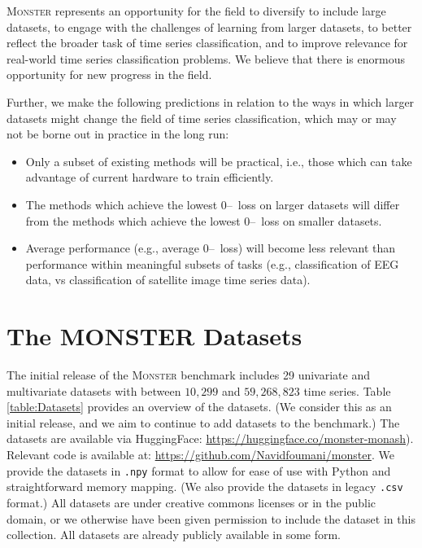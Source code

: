 \documentclass[twoside,11pt,preprint]{article}
\newcommand{\monster}{\textsc{Monster}}
\newcommand{\zo}{\mbox{0--\!1}~loss}
\begin{document}
{\monster} represents an opportunity for the field to diversify to include large datasets, to engage with the challenges of learning from larger datasets, to better reflect the broader task of time series classification, and to improve relevance for real-world time series classification problems. We believe that there is enormous opportunity for new progress in the field.

Further, we make the following predictions in relation to the ways in which larger datasets might change the field of time series classification, which may or may not be borne out in practice in the long run:%
\begin{itemize}%
\item Only a subset of existing methods will be practical, i.e., those which can take advantage of current hardware to train efficiently.%
\item The methods which achieve the lowest {\zo} on larger datasets will differ from the methods which achieve the lowest {\zo} on smaller datasets.%
\item Average performance (e.g., average {\zo}) will become less relevant than performance within meaningful subsets of tasks (e.g., classification of EEG data, vs classification of satellite image time series data).%
\end{itemize}


\section{The MONSTER Datasets} \label{sec-monster}


The initial release of the {\monster} benchmark includes 29 univariate and multivariate datasets with between $10{,}299$ and $59{,}268{,}823$ time series. Table \ref{table:Datasets} provides an overview of the datasets. (We consider this as an initial release, and we aim to continue to add datasets to the benchmark.)  The datasets are available via HuggingFace: \url{https://huggingface.co/monster-monash}). Relevant code is available at: \url{https://github.com/Navidfoumani/monster}. We provide the datasets in \texttt{.npy} format to allow for ease of use with Python and straightforward memory mapping. (We also provide the datasets in legacy \texttt{.csv} format.)  All datasets are under creative commons licenses or in the public domain, or we otherwise have been given permission to include the dataset in this collection. All datasets are already publicly available in some form.
\end{document}
